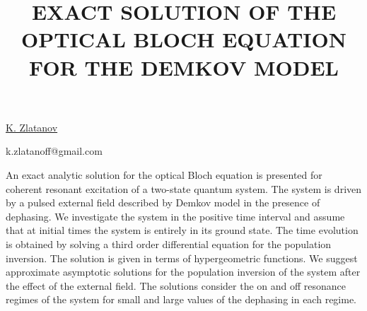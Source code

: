 \title{EXACT SOLUTION OF THE OPTICAL BLOCH EQUATION FOR THE DEMKOV MODEL}

\underline{K. Zlatanov} 

{\normalsize{\vspace{-4mm}
\unisofia

\email k.zlatanoff@gmail.com}}

An exact analytic solution for the optical Bloch equation is presented for coherent
resonant excitation of a two-state quantum system. The system is driven by a
pulsed external field described by Demkov model in the presence
of dephasing. We investigate the system in the positive time interval and assume
that at initial times the system is entirely in its ground state. The time evolution is
obtained by solving a third order differential equation for the population inversion.
The solution is given in terms of hypergeometric functions. We suggest approximate
asymptotic solutions for the population inversion of the system after the effect
of the external field. The solutions consider the on and off resonance regimes of
the system for small and large values of the dephasing in each regime.


\vspace{\baselineskip}
